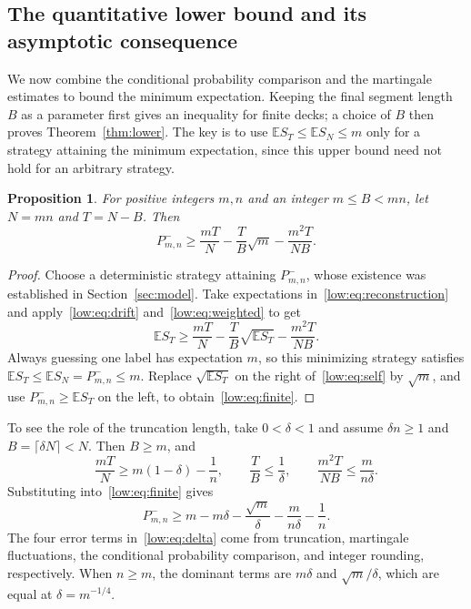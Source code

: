 \documentclass[11pt,reqno]{amsart}
\numberwithin{equation}{section}
\newtheorem{proposition}[theorem]{Proposition}
\theoremstyle{remark}
\theoremstyle{definition}
\newcommand{\E}{\mathbb E}
\begin{document}
\subsection{The quantitative lower bound and its asymptotic consequence}\label{sec:quantitative}
We now combine the conditional probability comparison and the martingale estimates to bound the minimum expectation. Keeping the final segment length $B$ as a parameter first gives an inequality for finite decks; a choice of $B$ then proves Theorem~\ref{thm:lower}. The key is to use $\E S_T\le\E S_N\le m$ only for a strategy attaining the minimum expectation, since this upper bound need not hold for an arbitrary strategy.
\begin{proposition}\label{low:thm:main}
For positive integers $m,n$ and an integer $m\le B<mn$, let $N=mn$ and $T=N-B$. Then
\begin{equation}\label{low:eq:finite}
 P^-_{m,n}\ge
 \frac{mT}{N}-\frac TB\sqrt m-\frac{m^2T}{NB}.
\end{equation}
\end{proposition}
\begin{proof}
Choose a deterministic strategy attaining $P^-_{m,n}$, whose existence was established in Section~\ref{sec:model}. Take expectations in~\eqref{low:eq:reconstruction} and apply~\eqref{low:eq:drift} and~\eqref{low:eq:weighted} to get
\begin{equation}\label{low:eq:self}
 \E S_T\ge\frac{mT}{N}
 -\frac TB\sqrt{\E S_T}-\frac{m^2T}{NB}.
\end{equation}
Always guessing one label has expectation $m$, so this minimizing strategy satisfies $\E S_T\le\E S_N=P^-_{m,n}\le m$. Replace $\sqrt{\E S_T}$ on the right of~\eqref{low:eq:self} by $\sqrt m$, and use $P^-_{m,n}\ge\E S_T$ on the left, to obtain~\eqref{low:eq:finite}.
\end{proof}
To see the role of the truncation length, take $0<\delta<1$ and assume $\delta n\ge1$ and $B=\lceil\delta N\rceil<N$. Then $B\ge m$, and
\[
 \frac{mT}{N}\ge m(1-\delta)-\frac1n,\qquad
 \frac TB\le\frac1\delta,\qquad
 \frac{m^2T}{NB}\le\frac{m}{n\delta}.
\]
Substituting into~\eqref{low:eq:finite} gives
\begin{equation}\label{low:eq:delta}
 P^-_{m,n}\ge m-m\delta-\frac{\sqrt m}{\delta}
 -\frac{m}{n\delta}-\frac1n.
\end{equation}
The four error terms in~\eqref{low:eq:delta} come from truncation, martingale fluctuations, the conditional probability comparison, and integer rounding, respectively. When $n\ge m$, the dominant terms are $m\delta$ and $\sqrt m/\delta$, which are equal at $\delta=m^{-1/4}$.
\end{document}
